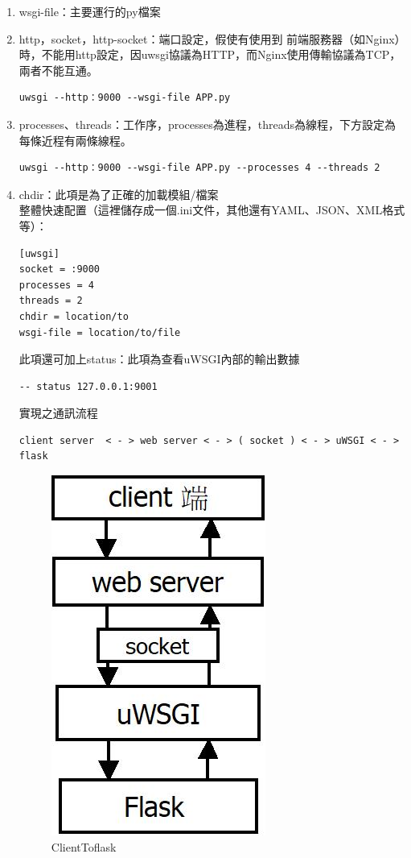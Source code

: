 \documentclass[14pt,a4paper]{report}  %
\begin{document}
 \begin{enumerate} 
 \item wsgi-file：主要運行的py檔案
 \item http，socket，http-socket：端口設定，假使有使用到 前端服務器（如Nginx）時，不能用http設定，因uwsgi協議為HTTP，而Nginx使用傳輸協議為TCP，兩者不能互通。
 \begin{lstlisting}[caption=\Large\sectionef 簡易uwsgi指令啟動]
  uwsgi --http：9000 --wsgi-file APP.py 
\end{lstlisting}
 \item processes、threads：工作序，processes為進程，threads為線程，下方設定為每條近程有兩條線程。
 \begin{lstlisting}[caption=\Large\sectionef 加入工作程序uwsgi指令啟動]
  uwsgi --http：9000 --wsgi-file APP.py --processes 4 --threads 2
\end{lstlisting}
\item chdir：此項是為了正確的加載模組/檔案 \\
整體快速配置（這裡儲存成一個.ini文件，其他還有YAML、JSON、XML格式等）：
\begin{lstlisting}[caption=\Large\sectionef 將uwsgi指令啟動動作設定成一個啟動檔]
  [uwsgi]
socket = :9000
processes = 4
threads = 2
chdir = location/to
wsgi-file = location/to/file
\end{lstlisting}
此項還可加上status：此項為查看uWSGI內部的輸出數據\\
\begin{lstlisting}[caption=status]
  -- status 127.0.0.1:9001
\end{lstlisting}
實現之通訊流程 
\begin{lstlisting}[caption=\Large\sectionef Client端與Flask應用]
  client server  < - > web server < - > ( socket ) < - > uWSGI < - > flask 
\end{lstlisting}
\begin{figure}[hbt!]
\begin{center}
\includegraphics[scale=0.65]{clientToflask}
\caption{\Large ClientToflask}
\label{ClientToflask}
\end{center}
\end{figure}
 \end{enumerate}
 \newpage
\end{document}
